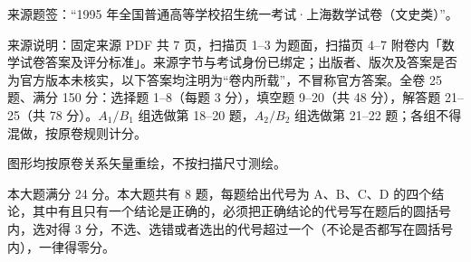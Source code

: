 

来源题签：“1995 年全国普通高等学校招生统一考试·上海数学试卷（文史类）”。

\begin{gktip}
来源说明：固定来源 PDF 共 7 页，扫描页 1–3 为题面，扫描页 4–7 附卷内「数学试卷答案及评分标准」。来源字节与考试身份已绑定；出版者、版次及答案是否为官方版本未核实，以下答案均注明为“卷内所载”，不冒称官方答案。全卷 25 题、满分 150 分：选择题 1–8（每题 3 分），填空题 9–20（共 48 分），解答题 21–25（共 78 分）。$A_1/B_1$ 组选做第 18–20 题，$A_2/B_2$ 组选做第 21–22 题；各组不得混做，按原卷规则计分。

图形均按原卷关系矢量重绘，不按扫描尺寸测绘。
\end{gktip}


本大题满分 24 分。本大题共有 8 题，每题给出代号为 A、B、C、D 的四个结论，其中有且只有一个结论是正确的，必须把正确结论的代号写在题后的圆括号内，选对得 3 分，不选、选错或者选出的代号超过一个（不论是否都写在圆括号内），一律得零分。


